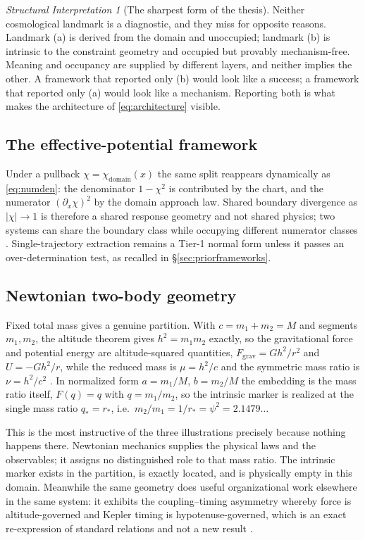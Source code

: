 \documentclass[11pt,a4paper]{article}
\theoremstyle{definition}
\theoremstyle{plain}
\theoremstyle{remark}
\newtheorem{interpretation}[definition]{Structural Interpretation}
\begin{document}
\begin{interpretation}[The sharpest form of the thesis]
\label{int:sharpest}
Neither cosmological landmark is a diagnostic, and they miss for opposite
reasons. Landmark (a) is derived from the domain and unoccupied; landmark (b)
is intrinsic to the constraint geometry and occupied but provably mechanism-free.
Meaning and occupancy are supplied by different layers, and neither implies the
other. A framework that reported only (b) would look like a success; a
framework that reported only (a) would look like a mechanism. Reporting both is
what makes the architecture of \eqref{eq:architecture} visible.
\end{interpretation}

\subsection{The effective-potential framework}

Under a pullback $\chi=\chi_{\mathrm{domain}}(x)$ the same split reappears
dynamically as \eqref{eq:numden}: the denominator $1-\chi^{2}$ is contributed
by the chart, and the numerator $(\partial_{x}\chi)^{2}$ by the domain approach
law. Shared boundary divergence as $|\chi|\to 1$ is therefore a shared response
geometry and not shared physics; two systems can share the boundary class while
occupying different numerator classes \cite{EffPot}. Single-trajectory
extraction remains a Tier-1 normal form unless it passes an over-determination
test, as recalled in \S\ref{sec:priorframeworks}.

\subsection{Newtonian two-body geometry}

Fixed total mass gives a genuine partition. With $c=m_{1}+m_{2}=M$ and
segments $m_{1},m_{2}$, the altitude theorem gives $h^{2}=m_{1}m_{2}$ exactly,
so the gravitational force and potential energy are altitude-squared
quantities, $F_{\mathrm{grav}}=Gh^{2}/r^{2}$ and $U=-Gh^{2}/r$, while the
reduced mass is $\mu=h^{2}/c$ and the symmetric mass ratio is $\nu=h^{2}/c^{2}$
\cite{Newtonian2Body}. In normalized form $a=m_{1}/M$, $b=m_{2}/M$ the
embedding is the mass ratio itself, $F(q)=q$ with $q=m_{1}/m_{2}$, so the
intrinsic marker is realized at the single mass ratio $q_{*}=r_{*}$, i.e.\
$m_{2}/m_{1}=1/r_{*}=\psi^{2}=2.1479\ldots$

This is the most instructive of the three illustrations precisely because
nothing happens there. Newtonian mechanics supplies the physical laws and the
observables; it assigns no distinguished role to that mass ratio. The intrinsic
marker exists in the partition, is exactly located, and is physically empty in
this domain. Meanwhile the same geometry does useful organizational work
elsewhere in the same system: it exhibits the coupling--timing asymmetry
whereby force is altitude-governed and Kepler timing is hypotenuse-governed,
which is an exact re-expression of standard relations and not a new result
\cite{Newtonian2Body}.
\end{document}
